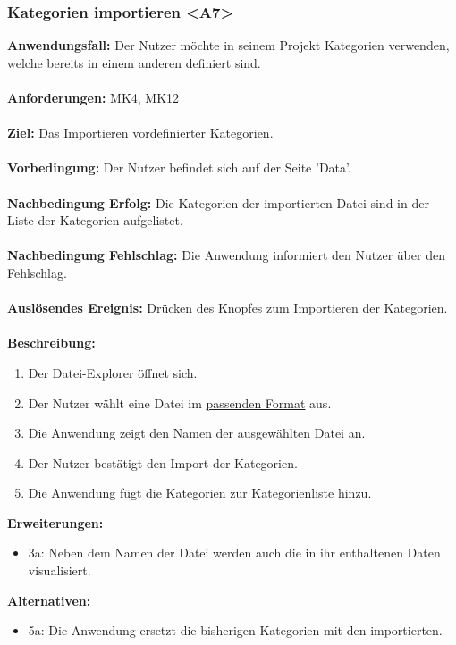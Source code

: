 \documentclass[parskip=full]{scrartcl} %
\begin{document}
\subsubsection*{Kategorien importieren <A7>}
\textbf{Anwendungsfall:} Der Nutzer möchte in seinem Projekt Kategorien verwenden, welche bereits in einem anderen definiert sind.\\\\
\textbf{Anforderungen:} MK4, MK12\\\\
\textbf{Ziel:} Das Importieren vordefinierter Kategorien. \\\\
\textbf{Vorbedingung:} Der Nutzer befindet sich auf der Seite 'Data'. \\\\
\textbf{Nachbedingung Erfolg:} Die Kategorien der importierten Datei sind in der Liste der Kategorien aufgelistet. \\\\
\textbf{Nachbedingung Fehlschlag:} Die Anwendung informiert den Nutzer über den Fehlschlag. \\\\
\textbf{Auslösendes Ereignis:} Drücken des Knopfes zum Importieren der Kategorien.\\\\
\textbf{Beschreibung:}
\begin{enumerate}
    \item Der Datei-Explorer öffnet sich.
    \item Der Nutzer wählt eine Datei im \hyperlink{dataformat}{passenden Format} aus.
    \item Die Anwendung zeigt den Namen der ausgewählten Datei an.
    \item Der Nutzer bestätigt den Import der Kategorien.
    \item Die Anwendung fügt die Kategorien zur Kategorienliste hinzu.
\end{enumerate}
\textbf{Erweiterungen:} 
\begin{itemize}
    \item 3a: Neben dem Namen der Datei werden auch die in ihr enthaltenen Daten visualisiert.
\end{itemize}
\textbf{Alternativen:} 
\begin{itemize}
    \item 5a: Die Anwendung ersetzt die bisherigen Kategorien mit den importierten.
\end{itemize}
\newpage
\end{document}

